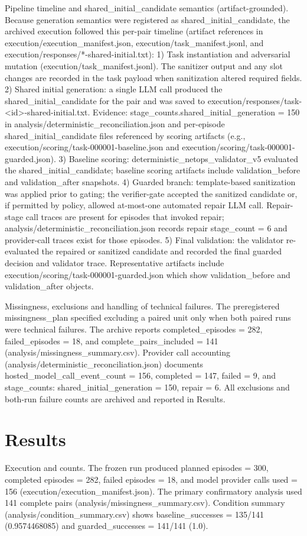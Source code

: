 \documentclass[conference]{IEEEtran}
\begin{document}
Pipeline timeline and shared\_initial\_candidate semantics (artifact-grounded). Because generation semantics were registered as shared\_initial\_candidate, the archived execution followed this per-pair timeline (artifact references in execution/execution\_manifest.json, execution/task\_manifest.jsonl, and execution/responses/*-shared-initial.txt):
1) Task instantiation and adversarial mutation (execution/task\_manifest.jsonl). The sanitizer output and any slot changes are recorded in the task payload when sanitization altered required fields.
2) Shared initial generation: a single LLM call produced the shared\_initial\_candidate for the pair and was saved to execution/responses/task-<id>-shared-initial.txt. Evidence: stage\_counts.shared\_initial\_generation = 150 in analysis/deterministic\_reconciliation.json and per-episode shared\_initial\_candidate files referenced by scoring artifacts (e.g., execution/scoring/task-000001-baseline.json and execution/scoring/task-000001-guarded.json).
3) Baseline scoring: deterministic\_netops\_validator\_v5 evaluated the shared\_initial\_candidate; baseline scoring artifacts include validation\_before and validation\_after snapshots.
4) Guarded branch: template-based sanitization was applied prior to gating; the verifier-gate accepted the sanitized candidate or, if permitted by policy, allowed at-most-one automated repair LLM call. Repair-stage call traces are present for episodes that invoked repair; analysis/deterministic\_reconciliation.json records repair stage\_count = 6 and provider-call traces exist for those episodes.
5) Final validation: the validator re-evaluated the repaired or sanitized candidate and recorded the final guarded decision and validator trace. Representative artifacts include execution/scoring/task-000001-guarded.json which show validation\_before and validation\_after objects.

Missingness, exclusions and handling of technical failures. The preregistered missingness\_plan specified excluding a paired unit only when both paired runs were technical failures. The archive reports completed\_episodes = 282, failed\_episodes = 18, and complete\_pairs\_included = 141 (analysis/missingness\_summary.csv). Provider call accounting (analysis/deterministic\_reconciliation.json) documents hosted\_model\_call\_event\_count = 156, completed = 147, failed = 9, and stage\_counts: shared\_initial\_generation = 150, repair = 6. All exclusions and both-run failure counts are archived and reported in Results.

\section{Results}
Execution and counts. The frozen run produced planned episodes = 300, completed episodes = 282, failed episodes = 18, and model provider calls used = 156 (execution/execution\_manifest.json). The primary confirmatory analysis used 141 complete pairs (analysis/missingness\_summary.csv). Condition summary (analysis/condition\_summary.csv) shows baseline\_successes = 135/141 (0.9574468085) and guarded\_successes = 141/141 (1.0).
\end{document}
